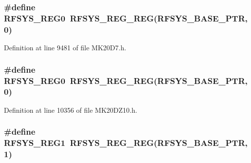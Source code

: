 \subsubsection[{\texorpdfstring{R\+F\+S\+Y\+S\+\_\+\+R\+E\+G0}{RFSYS_REG0}}]{\setlength{\rightskip}{0pt plus 5cm}\#define R\+F\+S\+Y\+S\+\_\+\+R\+E\+G0~{\bf R\+F\+S\+Y\+S\+\_\+\+R\+E\+G\+\_\+\+R\+EG}({\bf R\+F\+S\+Y\+S\+\_\+\+B\+A\+S\+E\+\_\+\+P\+TR},0)}\hypertarget{group___r_f_s_y_s___register___accessor___macros_gac8659efbc5335c7c55ce700f560e641f}{}\label{group___r_f_s_y_s___register___accessor___macros_gac8659efbc5335c7c55ce700f560e641f}


Definition at line 9481 of file M\+K20\+D7.\+h.

\subsubsection[{\texorpdfstring{R\+F\+S\+Y\+S\+\_\+\+R\+E\+G0}{RFSYS_REG0}}]{\setlength{\rightskip}{0pt plus 5cm}\#define R\+F\+S\+Y\+S\+\_\+\+R\+E\+G0~{\bf R\+F\+S\+Y\+S\+\_\+\+R\+E\+G\+\_\+\+R\+EG}({\bf R\+F\+S\+Y\+S\+\_\+\+B\+A\+S\+E\+\_\+\+P\+TR},0)}\hypertarget{group___r_f_s_y_s___register___accessor___macros_gac8659efbc5335c7c55ce700f560e641f}{}\label{group___r_f_s_y_s___register___accessor___macros_gac8659efbc5335c7c55ce700f560e641f}


Definition at line 10356 of file M\+K20\+D\+Z10.\+h.

\subsubsection[{\texorpdfstring{R\+F\+S\+Y\+S\+\_\+\+R\+E\+G1}{RFSYS_REG1}}]{\setlength{\rightskip}{0pt plus 5cm}\#define R\+F\+S\+Y\+S\+\_\+\+R\+E\+G1~{\bf R\+F\+S\+Y\+S\+\_\+\+R\+E\+G\+\_\+\+R\+EG}({\bf R\+F\+S\+Y\+S\+\_\+\+B\+A\+S\+E\+\_\+\+P\+TR},1)}\hypertarget{group___r_f_s_y_s___register___accessor___macros_ga20ef6da127caf2238db5623847eb2ada}{}\label{group___r_f_s_y_s___register___accessor___macros_ga20ef6da127caf2238db5623847eb2ada}


